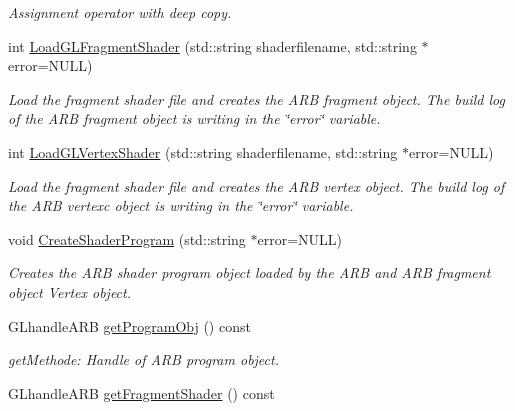 \begin{DoxyCompactItemize}
\begin{DoxyCompactList}\small\item\em Assignment operator with deep copy. \item\end{DoxyCompactList}\item 
int \hyperlink{class_f2_c_1_1_shader_g_l_a5c19c8364464a6a1e5d4d897a20160bf}{LoadGLFragmentShader} (std::string shaderfilename, std::string $\ast$error=NULL)
\begin{DoxyCompactList}\small\item\em Load the fragment shader file and creates the ARB fragment object. The build log of the ARB fragment object is writing in the \char`\"{}error\char`\"{} variable. \item\end{DoxyCompactList}\item 
int \hyperlink{class_f2_c_1_1_shader_g_l_a3b03b241623c5df2d5dd1083fc568608}{LoadGLVertexShader} (std::string shaderfilename, std::string $\ast$error=NULL)
\begin{DoxyCompactList}\small\item\em Load the fragment shader file and creates the ARB vertex object. The build log of the ARB vertexc object is writing in the \char`\"{}error\char`\"{} variable. \item\end{DoxyCompactList}\item 
void \hyperlink{class_f2_c_1_1_shader_g_l_a01f179b663f415a273245fdbfb91cff7}{CreateShaderProgram} (std::string $\ast$error=NULL)
\begin{DoxyCompactList}\small\item\em Creates the ARB shader program object loaded by the ARB and ARB fragment object Vertex object. \item\end{DoxyCompactList}\item 
\hypertarget{class_f2_c_1_1_shader_g_l_aa9aff7055483876e757ec410d526c80f}{
GLhandleARB \hyperlink{class_f2_c_1_1_shader_g_l_aa9aff7055483876e757ec410d526c80f}{getProgramObj} () const }
\label{class_f2_c_1_1_shader_g_l_aa9aff7055483876e757ec410d526c80f}

\begin{DoxyCompactList}\small\item\em getMethode: Handle of ARB program object. \item\end{DoxyCompactList}\item 
\hypertarget{class_f2_c_1_1_shader_g_l_a347bdd4be7e4f63d63cad93127eef9ef}{
GLhandleARB \hyperlink{class_f2_c_1_1_shader_g_l_a347bdd4be7e4f63d63cad93127eef9ef}{getFragmentShader} () const }
\label{class_f2_c_1_1_shader_g_l_a347bdd4be7e4f63d63cad93127eef9ef}


\end{DoxyCompactItemize}
